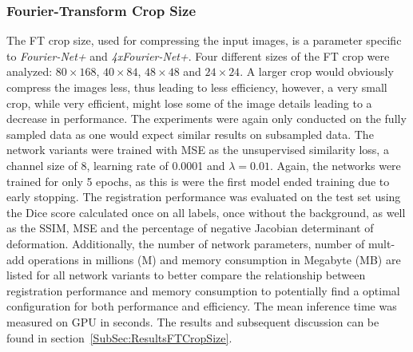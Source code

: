 \documentclass[english,version-2022-01]{uzl-thesis} %
\begin{document}
\subsubsection{Fourier-Transform Crop Size} \label{SubSubSec:FTCropSize}
The FT crop size, used for compressing the input images, is a parameter specific to \emph{Fourier-Net+} and \emph{4xFourier-Net+}. Four different sizes of the FT crop were analyzed: $80 \times 168$, $40 \times 84$, $48 \times 48$ and $24 \times 24$. A larger crop would obviously compress the images less, thus leading to less efficiency, however, a very small crop, while very efficient, might lose some of the image details leading to a decrease in performance. The experiments were again only conducted on the fully sampled data as one would expect similar results on subsampled data. The network variants were trained with MSE as the unsupervised similarity loss, a channel size of 8, learning rate of 0.0001 and $\lambda=0.01$. Again, the networks were trained for only 5 epochs, as this is were the first model ended training due to early stopping. The registration performance was evaluated on the test set using the Dice score calculated once on all labels, once without the background, as well as the SSIM, MSE and the percentage of negative Jacobian determinant of deformation. Additionally, the number of network parameters, number of mult-add operations in millions (M) and memory consumption in Megabyte (MB) are listed for all network variants to better compare the relationship between registration performance and memory consumption to potentially find a optimal configuration for both performance and efficiency. The mean inference time was measured on GPU in seconds. The results and subsequent discussion can be found in section~\ref{SubSec:ResultsFTCropSize}.
\end{document}
